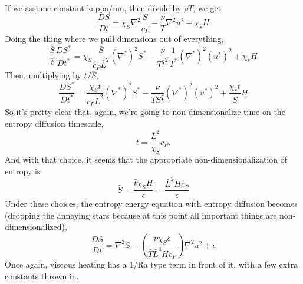 \documentclass[aps, pre, onecolumn, nofootinbib, notitlepage, groupedaddress, amsfonts, amssymb, amsmath, longbibliography]{revtex4-1}
\newcommand{\grad}{\ensuremath{\nabla}}
\begin{document}
If we assume constant kappa/mu, then divide by $\rho T$, we get
\begin{equation}
\frac{DS}{Dt} = \chi_S\grad^2 \frac{S}{c_P} - \frac{\nu}{T}\grad^2 u^2 + \chi_s H
\end{equation}
Doing the thing where we pull dimensions out of everything,
$$
\frac{\bar{S}}{\bar{t}}\frac{D S^*}{D t^*} = \chi_S \frac{\bar{S}}{c_P\bar{L}^2}(\grad^*)^2 S^*
- \frac{\nu}{\bar{T}\bar{t}^2}\frac{1}{T^*}(\grad^*)^2(u^*)^2 + \chi_s H
$$
Then, multiplying by $\bar{t}/\bar{S}$,
\begin{equation}
\frac{DS^*}{Dt^*} = \frac{\chi_S \bar{t}}{c_P \bar{L}^2}(\grad^*)^2 S^* 
- \frac{\nu}{\bar{T}\bar{S}\bar{t}}(\grad^*)^2(u^*)^2 + \frac{\chi_s \bar{t}}{\bar{S}} H
\end{equation}
So it's pretty clear that, again, we're going to non-dimensionalize time on the entropy
diffusion timescale,
$$
\bar{t} = \frac{\bar{L}^2}{\chi_S}c_P.
$$
And with that choice, it seems that the appropriate non-dimensionalization of entropy
is
$$
\bar{S} = \frac{\bar{t}\chi_S H}{\epsilon} = \frac{\bar{L}^2 H c_P}{\epsilon}
$$
Under these choices, the entropy energy equation with entropy diffusion becomes (dropping the
annoying stars because at this point all important things are non-dimensionalized),
\begin{equation}
\frac{D S}{D t} = \grad^2 S - \left(\frac{\nu\chi_S\epsilon}{\bar{T}\bar{L}^4 H c_P}\right)
\grad^2 u^2 + \epsilon
\end{equation}
Once again, viscous heating has a 1/Ra type term in front of it, with a few extra constants
thrown in.  
\end{document}

